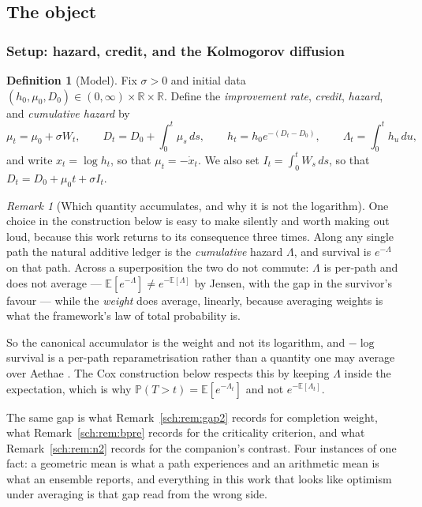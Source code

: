 \documentclass[11pt]{article}
\numberwithin{equation}{section}
\theoremstyle{plain}
\theoremstyle{definition}
\newtheorem{definition}[theorem]{Definition}
\theoremstyle{remark}
\newtheorem{remark}[theorem]{Remark}
\newcommand{\E}{\mathbb{E}}
\newcommand{\PP}{\mathbb{P}}
\newcommand{\R}{\mathbb{R}}
\begin{document}
\subsection{The object}\label{gr1:sub:object}\label{tc:sub:model}\label{sh:sub:model}


\subsubsection{Setup: hazard, credit, and the Kolmogorov diffusion}
\label{sh:subsub:setup}

\begin{definition}[Model]\label{sh:def:model}
Fix $\sigma>0$ and initial data $(h_0,\mu_0,D_0)\in(0,\infty)\times\R\times\R$.
Define the \emph{improvement rate}, \emph{credit}, \emph{hazard}, and
\emph{cumulative hazard} by
\begin{equation}\label{sh:eq:model}
\mu_t=\mu_0+\sigma W_t,\qquad
D_t=D_0+\int_0^t\mu_s\,ds,\qquad
h_t=h_0e^{-(D_t-D_0)},\qquad
\Lambda_t=\int_0^t h_u\,du,
\end{equation}
and write $x_t=\log h_t$, so that $\mu_t=-\dot x_t$. We also set
$I_t=\int_0^t W_s\,ds$, so that $D_t=D_0+\mu_0t+\sigma I_t$.
\end{definition}

\begin{remark}[Which quantity accumulates, and why it is not the
logarithm]\label{sh:rem:accumulator}
One choice in the construction below is easy to make silently and worth
making out loud, because this work returns to its consequence three
times. Along any single path the natural additive ledger is the
\emph{cumulative} hazard $\Lambda$, and survival is $e^{-\Lambda}$ on
that path. Across a superposition the two do not commute: $\Lambda$ is
per-path and does not average --- $\E[e^{-\Lambda}]\neq e^{-\E[\Lambda]}$
by Jensen, with the gap in the survivor's favour --- while the
\emph{weight} does average, linearly, because averaging weights is what
the framework's law of total probability is.

So the canonical accumulator is the weight and not its logarithm, and
$-\log$ survival is a per-path reparametrisation rather than a quantity
one may average over Aethae \cite{Aethus}. The Cox construction below
respects this by keeping $\Lambda$ inside the expectation, which is why
$\PP(T>t)=\E[e^{-\Lambda_t}]$ and not $e^{-\E[\Lambda_t]}$.

The same gap is what Remark~\ref{sch:rem:gap2} records for completion
weight, what Remark~\ref{sch:rem:bpre} records for the criticality
criterion, and what Remark~\ref{sch:rem:n2} records for the companion's
contrast. Four instances of one fact: a geometric mean is what a path
experiences and an arithmetic mean is what an ensemble reports, and
everything in this work that looks like optimism under averaging is that
gap read from the wrong side.
\end{remark}
\end{document}
